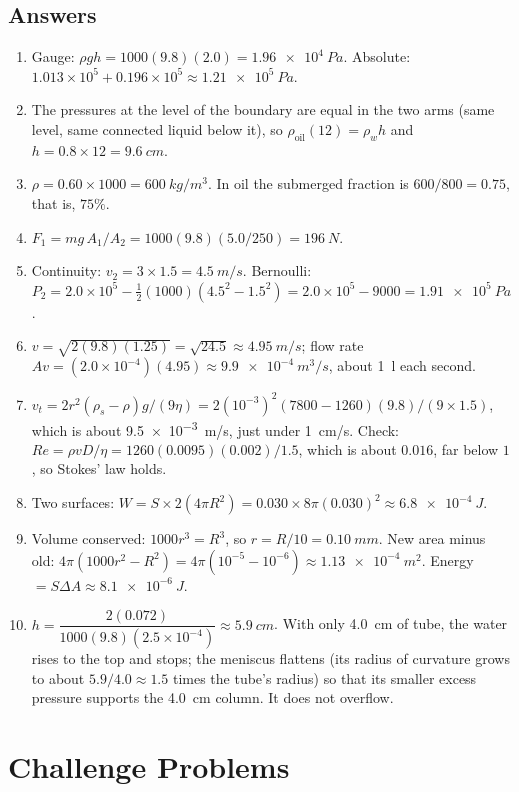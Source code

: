 \subsection*{Answers}
{\small
\begin{enumerate}[itemsep=2pt]
\item Gauge: $\rho gh=1000(9.8)(2.0)=\SI{1.96e4}{Pa}$. Absolute: $1.013\times10^5+0.196\times10^5
\approx\SI{1.21e5}{Pa}$.
\item The pressures at the level of the boundary are equal in the two arms (same level, same connected
liquid below it), so $\rho_{\text{oil}}(12)=\rho_w h$ and $h=0.8\times12=\SI{9.6}{cm}$.
\item $\rho=0.60\times1000=\SI{600}{kg/m^3}$. In oil the submerged fraction is $600/800=0.75$, that is,
$75\%$.
\item $F_1=mg\,A_1/A_2=1000(9.8)(5.0/250)=\SI{196}{N}$.
\item Continuity: $v_2=3\times1.5=\SI{4.5}{m/s}$. Bernoulli: $P_2=2.0\times10^5-\tfrac12(1000)(4.5^2-1.5^2)
=2.0\times10^5-9000=\SI{1.91e5}{Pa}$.
\item $v=\sqrt{2(9.8)(1.25)}=\sqrt{24.5}\approx\SI{4.95}{m/s}$; flow rate
$Av=(2.0\times10^{-4})(4.95)\approx\SI{9.9e-4}{m^3/s}$, about \SI{1}{\litre} each second.
\item $v_t=2r^2(\rho_s-\rho)g/(9\eta)=2(10^{-3})^2(7800-1260)(9.8)/(9\times1.5)$, which is about
\SI{9.5e-3}{m/s}, just under \SI{1}{cm/s}. Check: $Re=\rho vD/\eta=1260(0.0095)(0.002)/1.5$, which is
about $0.016$, far below $1$, so Stokes' law holds.
\item Two surfaces: $W=S\times2(4\pi R^2)=0.030\times8\pi(0.030)^2\approx\SI{6.8e-4}{J}$.
\item Volume conserved: $1000r^3=R^3$, so $r=R/10=\SI{0.10}{mm}$. New area minus old:
$4\pi(1000r^2-R^2)=4\pi(10^{-5}-10^{-6})\approx\SI{1.13e-4}{m^2}$. Energy $=S\Delta A\approx\SI{8.1e-6}{J}$.
\item $h=\dfrac{2(0.072)}{1000(9.8)(2.5\times10^{-4})}\approx\SI{5.9}{cm}$. With only \SI{4.0}{cm} of tube,
the water rises to the top and stops; the meniscus flattens (its radius of curvature grows to about
$5.9/4.0\approx1.5$ times the tube's radius) so that its smaller excess pressure supports the
\SI{4.0}{cm} column. It does not overflow.
\end{enumerate}
}

\section{Challenge Problems}\label{sec:fluids-challenge}

